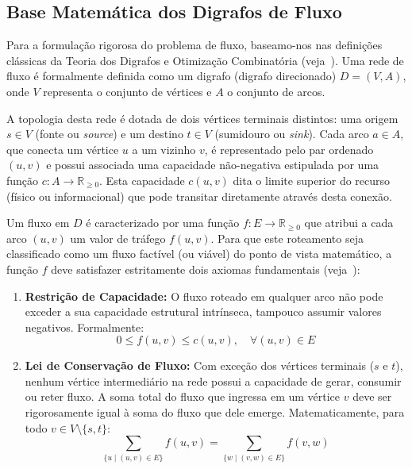 \documentclass[12pt,a4paper]{article}
\begin{document}
\subsection{Base Matemática dos Digrafos de Fluxo}

Para a formulação rigorosa do problema de fluxo, baseamo-nos nas definições clássicas da Teoria dos Digrafos e Otimização Combinatória (veja~\cite{ahuja1993network, bondy2008graph}). Uma rede de fluxo é formalmente definida como um digrafo (digrafo direcionado) $D = (V, A)$, onde $V$ representa o conjunto de vértices e $A$ o conjunto de arcos.

A topologia desta rede é dotada de dois vértices terminais distintos: uma origem $s \in V$ (fonte ou \textit{source}) e um destino $t \in V$ (sumidouro ou \textit{sink}). Cada arco $a \in A$, que conecta um vértice $u$ a um vizinho $v$, é representado pelo par ordenado $(u,v)$ e possui associada uma capacidade não-negativa estipulada por uma função $c: A \rightarrow \mathbb{R}_{\ge 0}$. Esta capacidade $c(u,v)$ dita o limite superior do recurso (físico ou informacional) que pode transitar diretamente através desta conexão.

Um fluxo em $D$ é caracterizado por uma função $f: E \rightarrow \mathbb{R}_{\ge 0}$ que atribui a cada arco $(u,v)$ um valor de tráfego $f(u,v)$. Para que este roteamento seja classificado como um fluxo factível (ou viável) do ponto de vista matemático, a função $f$ deve satisfazer estritamente dois axiomas fundamentais (veja~\cite{ford1956maximal, cook1998combinatorial}):

\begin{enumerate}
    \item \textbf{Restrição de Capacidade:} O fluxo roteado em qualquer arco não pode exceder a sua capacidade estrutural intrínseca, tampouco assumir valores negativos. Formalmente:
    \begin{equation}
        0 \le f(u,v) \le c(u,v), \quad \forall (u,v) \in E
    \end{equation}

    \item \textbf{Lei de Conservação de Fluxo:} Com exceção dos vértices terminais ($s$ e $t$), nenhum vértice intermediário na rede possui a capacidade de gerar, consumir ou reter fluxo. A soma total do fluxo que ingressa em um vértice $v$ deve ser rigorosamente igual à soma do fluxo que dele emerge. Matematicamente, para todo $v \in V \setminus \{s, t\}$:
    \begin{equation}
        \sum_{\{u \mid (u,v) \in E\}} f(u,v) = \sum_{\{w \mid (v,w) \in E\}} f(v,w)
    \end{equation}
\end{enumerate}
\end{document}
